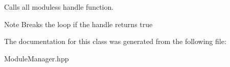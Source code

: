 Calls all modules\textquotesingle{}s handle function. 

\begin{DoxyNote}{Note}
Breaks the loop if the handle returns true 
\end{DoxyNote}


The documentation for this class was generated from the following file\+:\begin{DoxyCompactItemize}
\item 
Module\+Manager.\+hpp\end{DoxyCompactItemize}
